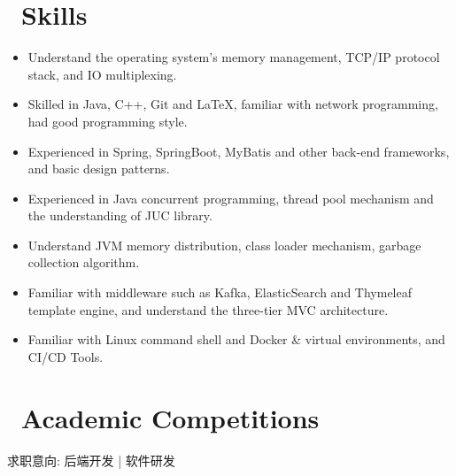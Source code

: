 \documentclass{resume}
\begin{document}
\section{\faCogs\ Skills}
\begin{itemize}[parsep=0.5ex]
  \item Understand the operating system's memory management, TCP/IP protocol stack, and IO multiplexing.
  \item Skilled in Java, C++, Git and \LaTeX, familiar with network programming, had good programming style.
  \item Experienced in Spring, SpringBoot, MyBatis and other back-end frameworks, and basic design patterns.
  \item Experienced in Java concurrent programming, thread pool mechanism and the understanding of JUC library.
  \item Understand JVM memory distribution, class loader mechanism, garbage collection algorithm.
  \item Familiar with middleware such as Kafka, ElasticSearch and Thymeleaf template engine, and understand the three-tier MVC architecture.
  \item Familiar with Linux command shell and Docker \& virtual environments, and CI/CD Tools.
\end{itemize}
\vspace{-1ex}

\section{\faTrophy\ Academic Competitions}


\clearpage

\centerline{求职意向: 后端开发 | 软件研发}
\vspace{1ex}


\end{document}

